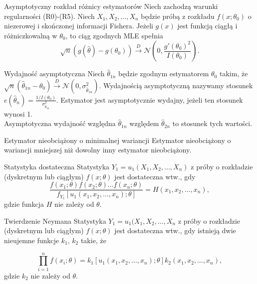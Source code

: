 \documentclass[avery5371, grid, frame]{flashcards}
\begin{document}
\begin{flashcard}[Twierdzenie]{Asymptotyczny rozkład różnicy estymatorów}
    Niech zachodzą warunki regularności (R0)-(R5). Niech $X_1, X_2, \dots, X_n$ będzie próbą z rozkładu $f(x; \theta_0)$ o niezerowej i skończonej informacji Fishera. Jeżeli $g(x)$ jest funkcją ciągłą i różniczkowalną w $\theta_0$, to ciąg zgodnych MLE spełnia
    $$\sqrt{n} (g(\hat{\theta}) - g(\theta_0)) \overset{D}{\rightarrow} \mathcal{N} \left( 0, \frac{g'(\theta_0)^2}{I(\theta_0)} \right). $$
\end{flashcard}

\begin{flashcard}[Definicja]{Wydajność asymptotyczna}
    Niech $\hat{\theta}_{1n}$ będzie zgodnym estymatorem $\theta_0$ takim, że $\sqrt{n}(\hat{\theta}_{1n} - \theta_0) \xrightarrow{D} \mathcal{N}(0, \sigma_{\hat{\theta}_{1n}}^2).$ Wydajnością asymptotyczną nazywamy stosunek $e(\hat{\theta}_{n}) = \frac{1/I(\theta_0)}{\sigma_{\hat{\theta}_{1n}}^2}$. Estymator jest asymptotycznie wydajny, jeżeli ten stosunek wynosi 1. \\
    Asymptotyczna wydajność względna $\hat{\theta}_{1n}$ względem $\hat{\theta}_{2n}$ to stosunek tych wartości.

\end{flashcard}

\begin{flashcard}[Definicja]{Estymator nieobciążony o minimalnej wariancji}
    Estymator nieobciążony o wariancji mniejszej niż dowolny inny estymator nieobciążony.
\end{flashcard}

\begin{flashcard}[Definicja]{Statystyka dostateczna}
    Statystyka $Y_1 = u_1(X_1, X_2, \dots, X_n)$ z próby o rozkładzie (dyskretnym lub ciągłym) $f(x; \theta)$ jest dostateczna wtw., gdy
    $$ \frac{f(x_1; \theta) f(x_2; \theta) \dots f(x_n; \theta)}{f_{Y_1}[u_1(x_1, x_2, \dots, x_n); \theta]} = H(x_1, x_2, \dots, x_n),$$ gdzie funkcja $H$ nie zależy od $\theta$.
\end{flashcard}

\begin{flashcard}[Twierdzenie]{Twierdzenie Neymana}
    Statystyka $Y_1 = u_1(X_1, X_2, \dots, X_n$ z próby o rozkładzie (dyskretnym lub ciągłym) $f(x; \theta)$ jest dostateczna wtw., gdy istnieją dwie nieujemne funkcje $k_1$, $k_2$ takie, że
    \begin{small}
    $$ \prod_{i=1}^n f(x_i; \theta) = k_1[u_1(x_1, x_2, \dots, x_n); \theta] k_2(x_1, x_2, \dots, x_n), $$ gdzie $k_2$ nie zależy od $\theta$.
    \end{small}
\end{flashcard}
\end{document}
